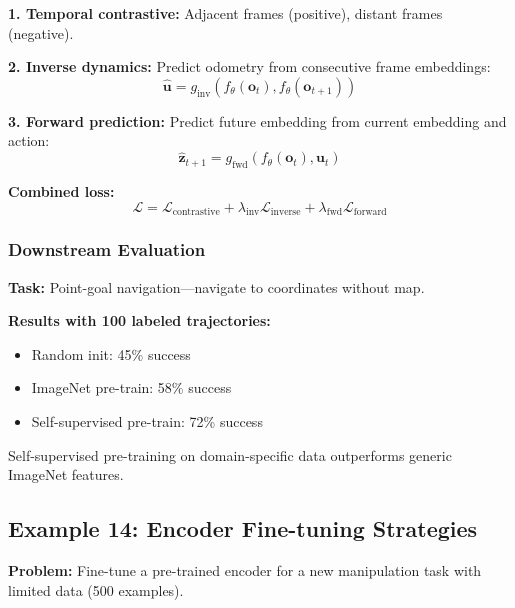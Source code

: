 \textbf{1. Temporal contrastive:}
Adjacent frames (positive), distant frames (negative).

\textbf{2. Inverse dynamics:}
Predict odometry from consecutive frame embeddings:
\begin{equation}
\hat{\mathbf{u}} = g_{\text{inv}}(f_\theta(\mathbf{o}_t), f_\theta(\mathbf{o}_{t+1}))
\label{eq:inv_dyn_nav}
\end{equation}

\textbf{3. Forward prediction:}
Predict future embedding from current embedding and action:
\begin{equation}
\hat{\mathbf{z}}_{t+1} = g_{\text{fwd}}(f_\theta(\mathbf{o}_t), \mathbf{u}_t)
\label{eq:fwd_pred_nav}
\end{equation}

\textbf{Combined loss:}
\begin{equation}
\mathcal{L} = \mathcal{L}_{\text{contrastive}} + \lambda_{\text{inv}} \mathcal{L}_{\text{inverse}} + \lambda_{\text{fwd}} \mathcal{L}_{\text{forward}}
\label{eq:combined_ssl}
\end{equation}

\subsubsection{Downstream Evaluation}

\textbf{Task:} Point-goal navigation---navigate to coordinates without map.

\textbf{Results with 100 labeled trajectories:}
\begin{itemize}
    \item Random init: 45\% success
    \item ImageNet pre-train: 58\% success
    \item Self-supervised pre-train: 72\% success
\end{itemize}

Self-supervised pre-training on domain-specific data outperforms generic ImageNet features.


\subsection{Example 14: Encoder Fine-tuning Strategies}

\textbf{Problem:} Fine-tune a pre-trained encoder for a new manipulation task with limited data (500 examples).

